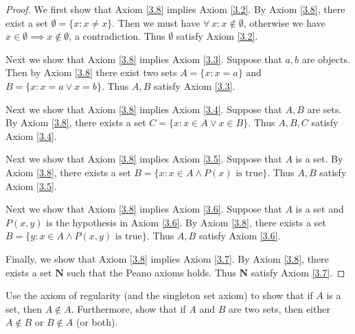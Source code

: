 \begin{proof}
We first show that Axiom \ref{3.8} implies Axiom \ref{3.2}.
By Axiom \ref{3.8}, there exist a set \(\emptyset = \{x: x \neq x\}\).
Then we must have \(\forall\ x : x \notin \emptyset\), otherwise we have \(x \in \emptyset \implies x \notin \emptyset\), a contradiction.
Thus \(\emptyset\) satisfy Axiom \ref{3.2}.

Next we show that Axiom \ref{3.8} implies Axiom \ref{3.3}.
Suppose that \(a, b\) are objects.
Then by Axiom \ref{3.8} there exist two sets \(A = \{x: x = a\}\) and \(B = \{x: x = a \lor x = b\}\).
Thus \(A, B\) satisfy Axiom \ref{3.3}.

Next we show that Axiom \ref{3.8} implies Axiom \ref{3.4}.
Suppose that \(A, B\) are sets.
By Axiom \ref{3.8}, there exists a set \(C = \{x : x \in A \lor x \in B\}\).
Thus \(A, B, C\) satisfy Axiom \ref{3.4}.

Next we show that Axiom \ref{3.8} implies Axiom \ref{3.5}.
Suppose that \(A\) is a set.
By Axiom \ref{3.8}, there exists a set \(B = \{x : x \in A \land P(x) \text{ is true}\}\).
Thus \(A, B\) satisfy Axiom \ref{3.5}.

Next we show that Axiom \ref{3.8} implies Axiom \ref{3.6}.
Suppose that \(A\) is a set and \(P(x, y)\) is the hypothesis in Axiom \ref{3.6}.
By Axiom \ref{3.8}, there exists a set \(B = \{y :  x \in A \land P(x, y) \text{ is true}\}\).
Thus \(A, B\) satisfy Axiom \ref{3.6}.

Finally, we show that Axiom \ref{3.8} implies Axiom \ref{3.7}.
By Axiom \ref{3.8}, there exists a set \(\mathbf{N}\) such that the Peano axioms holds.
Thus \(\mathbf{N}\) satisfy Axiom \ref{3.7}.
\end{proof}

\begin{exercise}\label{ex 3.2.2}
Use the axiom of regularity (and the singleton set axiom) to show that if \(A\) is a set, then \(A \notin A\).
Furthermore, show that if \(A\) and \(B\) are two sets, then either \(A \notin B\) or \(B \notin A\) (or both).
\end{exercise}

